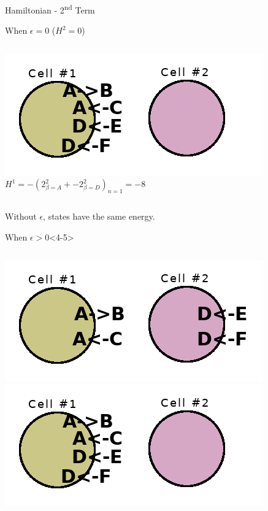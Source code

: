 \documentclass[10pt]{beamer}
\begin{document}
\begin{frame}{Hamiltonian - 2\textsuperscript{nd} Term}
{\begin{exampleblock}{\centering When $\epsilon = 0$ ($H^2 = 0$)}
\begin{columns}[T,onlytextwidth]
                \includegraphics[width=\textwidth]{png/false_config.png} \\
                $H^1 = - (2^2_{\beta=A} + -2^2_{\beta=D})_{n=1} = -8$
            \end{columns}
            \centering
            Without $\epsilon$, states have the same energy.
        \end{exampleblock}
    }
    \begin{exampleblock}{\centering When $\epsilon > 0$}<4-5>
        \begin{columns}[T,onlytextwidth]
            \includegraphics[width=\textwidth]{png/correct_config.png} \\
            \includegraphics[width=\textwidth]{png/false_config.png} \\

\end{columns}
\end{exampleblock}
\end{frame}
\end{document}
